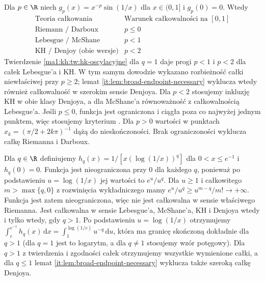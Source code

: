 \begin{przyklad}\label{ma1:kh:ex:oscillatory-thresholds}
Dla $p\in\R$ niech $g_p(x)=x^{-p}\sin(1/x)$
dla $x\in(0,1]$ i $g_p(0)=0$.
Wtedy
\[
\begin{array}{c|c}
\text{Teoria całkowania}&\text{Warunek całkowalności na }[0,1]\\\hline
\text{Riemann / Darboux}&p\le0\\
\text{Lebesgue / McShane}&p<1\\
\text{KH / Denjoy (obie wersje)}&p<2
\end{array}
\]
Twierdzenie \ref{ma1:kh:tw:hk-oscylacyjne} dla $q=1$
daje progi $p<1$ i $p<2$ dla całek Lebesgue'a i KH.
W tym samym dowodzie wykazano rozbieżność całki niewłaściwej
przy $p\ge2$; lemat \ref{it:lem:broad-endpoint-necessary}
wyklucza wtedy również całkowalność w szerokim sensie Denjoya.
Dla $p<2$ stosujemy inkluzję KH w obie klasy Denjoya,
a dla McShane'a równoważność z całkowalnością Lebesgue'a.
Jeśli $p\le0$, funkcja jest ograniczona i ciągła poza
co najwyżej jednym punktem, więc stosujemy kryterium
.
Dla $p>0$ wartości w punktach
$x_k=(\pi/2+2k\pi)^{-1}$ dążą do nieskończoności.
Brak ograniczoności wyklucza całkę Riemanna i Darboux.
\end{przyklad}

\begin{przyklad}\label{ma1:kh:ex:log-singularity}
Dla $q\in\R$ definiujemy $h_q(x)=1/[x(\log(1/x))^q]$ dla $0<x\le e^{-1}$ i $h_q(0)=0$. Funkcja jest nieograniczona przy $0$ dla każdego $q$, ponieważ po podstawieniu $u=\log(1/x)$ jej wartości
to $e^u/u^q$. Dla $u\ge1$ i całkowitego $m>\max\{q,0\}$
z rozwinięcia wykładniczego mamy
$e^u/u^q\ge u^{m-q}/m!\to+\infty$.
Funkcja jest zatem nieograniczona, więc nie jest całkowalna w sensie właściwego Riemanna. Jest całkowalna w sensie Lebesgue'a, McShane'a, KH i Denjoya wtedy i tylko wtedy, gdy $q>1$. Po podstawieniu $u=\log(1/x)$ otrzymujemy
$\int_c^{e^{-1}}h_q(x)\,\mathrm dx=\int_1^{\log(1/c)}u^{-q}\,\mathrm du$, która ma granicę skończoną dokładnie dla $q>1$ (dla $q=1$ jest to logarytm, a dla $q\ne1$ stosujemy wzór potęgowy). Dla $q>1$ z twierdzenia  i zgodności całek otrzymujemy wszystkie wymienione całki, a dla $q\le1$ lemat \ref{it:lem:broad-endpoint-necessary} wyklucza także szeroką całkę Denjoya.
\end{przyklad}


